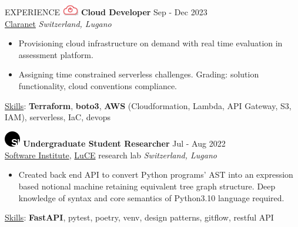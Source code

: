 \documentclass{cv} %
\def\intraexpvspace{0.15cm}
\def\titlelistvspace{-0.15cm}
\begin{document}
\begin{rSection}{EXPERIENCE}
    \includegraphics[width=0.7cm, trim={0cm 15cm 0cm 0cm}]{claranet-logo.png}
    \textbf{Cloud Developer} \hfill Sep - Dec 2023\\
    \hspace*{0.85cm}\href{https://www.claranet.com/}{Claranet}
    \hfill \textit{Switzerland, Lugano}
    \vspace{\titlelistvspace}\begin{itemize}
        \itemsep -3pt {}
        \item Provisioning cloud infrastructure on demand
              with real time evaluation in assessment platform.
        \item Assigning time constrained serverless challenges.
              Grading: solution functionality, cloud conventions compliance.
    \end{itemize}
    \vspace*{-0.1cm}\hspace*{0.5cm}\underline{Skills}: \textbf{Terraform},
    \textbf{boto3},
    \textbf{AWS} (Cloudformation, Lambda, API Gateway, S3, IAM), %
    serverless,
    IaC,
    devops
    \vspace{\intraexpvspace}

    \includegraphics[width=0.7cm, trim={0cm 10cm 0cm 0cm}]{si-icon.jpg}
    \hspace*{0cm}\textbf{Undergraduate Student Researcher} \hfill Jul - Aug 2022\\
    \hspace*{0.85cm}\href{https://www.si.usi.ch/}{Software Institute},
    \href{https://luce.si.usi.ch/}{LuCE} research lab
    \hfill \textit{Switzerland, Lugano}
    \vspace{\titlelistvspace}\begin{itemize}
        \itemsep -3pt {}
        \item Created back end API to convert Python programs' AST
              into an expression based notional machine retaining equivalent tree graph structure.
              Deep knowledge of syntax and core semantics of Python3.10 language required.
    \end{itemize}
    \vspace*{-0.1cm}\hspace*{0.5cm}\underline{Skills}: \textbf{FastAPI}, pytest, poetry, venv, design patterns, gitflow, restful API
    \vspace{\intraexpvspace}


\end{rSection}
\end{document}
